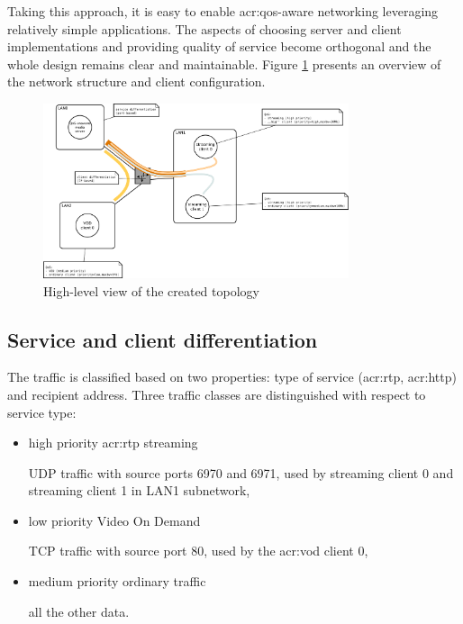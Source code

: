 \documentclass[11pt,openany]{book}
\begin{document}
        Taking this approach, it is easy to enable \gls{acr:qos}-aware networking leveraging relatively simple
        applications. The aspects of choosing server and client implementations and providing quality of service become
        orthogonal and the whole design remains clear and maintainable. Figure \ref{fig:cs:scenario} presents an
        overview of the network structure and client configuration.
      
        \begin{figure}[H]
          \begin{center}
            \includegraphics[width=0.8\textwidth]{img/test-case/diagram.pdf}
          \end{center}

          \caption{High-level view of the created topology}
          \label{fig:cs:scenario}
        \end{figure}
      

      \subsection{Service and client differentiation}
      \label{sub:uc:diff}

        The traffic is classified based on two properties: type of service (\gls{acr:rtp}, \gls{acr:http}) and recipient
        address. Three traffic classes are distinguished with respect to service type:

        \begin{itemize}

          \item high priority \gls{acr:rtp} streaming

                UDP traffic with source ports 6970 and 6971, used by streaming client 0
                and streaming client 1 in LAN1 subnetwork,

          \item low priority Video On Demand
          
                TCP traffic with source port 80, used by the \gls{acr:vod} client 0,

          \item medium priority ordinary traffic
          
                all the other data.

        \end{itemize}
\end{document}
